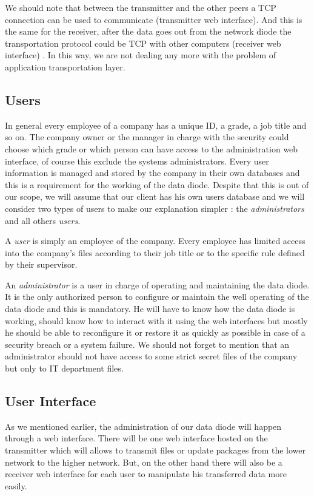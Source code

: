 \documentclass[a4paper,10pt]{article}
\begin{document}
We should note that between the transmitter and the other peers a TCP connection can be used to communicate (transmitter web interface). And this is the same for the receiver, after the data goes out from the network diode the transportation protocol could be TCP with other computers (receiver web interface) . In this way, we are not dealing any more with the problem of application transportation layer. 

\subsection{Users} 
In general every employee of a company has a unique ID, a grade, a job title and so on. The company owner or the manager in charge with the security could choose which grade or which person can have access to the administration web interface, of course this exclude the systems administrators. Every user information is managed and stored by the company in their own databases and this is a requirement for the working of the data diode. Despite that this is out of our scope, we will assume that our client has his own users database and we will consider two types of users to make our explanation simpler : the \textit{administrators} and all others \textit{users}.

A \textit{user} is simply an employee of the company. Every employee has limited access into the company's files according to their job title or to the specific rule defined by their supervisor.

An \textit{administrator} is a user in charge of operating and maintaining the data diode. It is the only authorized person to configure or maintain the well operating of the data diode and this is mandatory. He will have to know how the data diode is working, should know how to interact with it using the web interfaces but mostly he should be able to reconfigure it or restore it as quickly as possible in case of a security breach or a system failure. We should not forget to mention that an administrator should not have access to some strict secret files of the company but only to IT department files.


\subsection{User Interface}

As we mentioned earlier, the administration of our data diode will happen through a web interface. There will be one web interface hosted on the transmitter which will allows to transmit files or update packages from the lower network to the higher network. But, on the other hand there will also be a receiver web interface for each user to manipulate his transferred data more easily.
\end{document}

